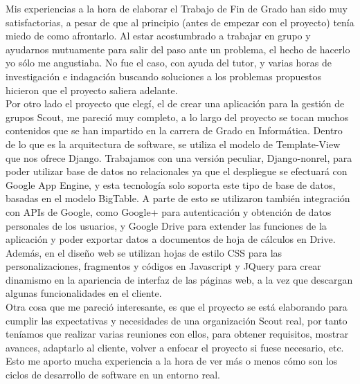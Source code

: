 



Mis experiencias a la hora de elaborar el Trabajo de Fin de Grado han sido muy satisfactorias, a pesar de que al principio 
(antes de empezar con el proyecto) tenía miedo de como afrontarlo. Al estar acostumbrado a trabajar en grupo y ayudarnos 
mutuamente para salir del paso ante un problema, el hecho de hacerlo yo sólo me angustiaba. No fue el caso, con ayuda del 
tutor, y varias horas de investigación e indagación buscando soluciones a los problemas propuestos hicieron que el proyecto saliera adelante.\\

Por otro lado el proyecto que elegí, el de crear una aplicación para la gestión de grupos Scout, me pareció muy completo, a lo 
largo del proyecto se tocan muchos contenidos que se han impartido en la carrera de Grado en Informática. Dentro de lo que es la 
arquitectura de software, se utiliza el modelo de Template-View que nos ofrece Django. Trabajamos con una versión peculiar,
Django-nonrel, para poder utilizar base de datos no relacionales ya que el despliegue se efectuará con Google App Engine, y esta tecnología 
solo soporta este tipo de base de datos, basadas en el modelo BigTable. A parte de esto se utilizaron también integración 
con APIs de Google, como Google+ para autenticación y obtención de datos personales de los usuarios, y Google Drive para extender 
las funciones de la aplicación y poder exportar datos a documentos de hoja de cálculos en Drive. Además, en el diseño web se utilizan 
hojas de estilo CSS para las personalizaciones, fragmentos y códigos en Javascript y JQuery para crear dinamismo en la apariencia de interfaz de las páginas web, 
a la vez que descargan algunas funcionalidades en el cliente.\\

Otra cosa que me pareció interesante, es que el proyecto se está elaborando para cumplir las expectativas y necesidades de una organización 
Scout real, por tanto teníamos que realizar varias reuniones con ellos, para obtener requisitos, mostrar avances, adaptarlo al cliente, 
volver a enfocar el proyecto si fuese necesario, etc. Esto me aporto mucha experiencia a la hora de ver más o menos cómo son los ciclos de
desarrollo de software en un entorno real.\\


